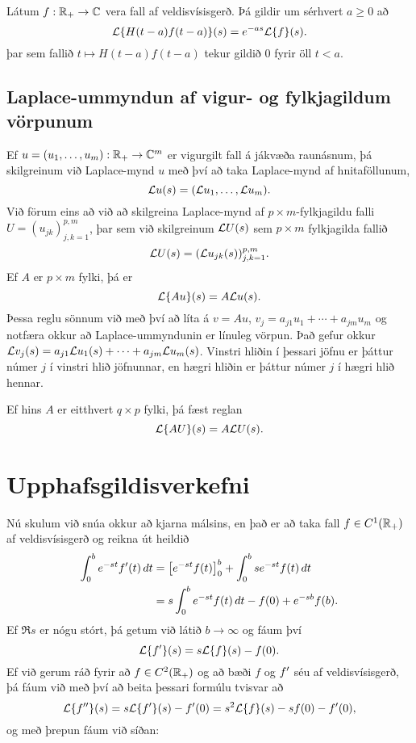 \begin{se}  Látum $f:{\mathbb R}_+\to {\mathbb C}$ vera fall af veldisvísisgerð.  Þá gildir um
sérhvert $a\geq 0$ að
$$
{\cal L}{\{H(t-a)f(t-a)\}}(s) = e^{-as}{\cal L}{\{f\}}(s).
$$
þar sem fallið $t\mapsto H(t-a)f(t-a)$ tekur gildið $0$ fyrir öll
$t<a$. 
\end{se}

\subsection*{Laplace-ummyndun af vigur- og fylkjagildum vörpunum}

Ef $u=(u_1,\dots,u_m): {\mathbb R}_+\to {\mathbb C}^m$ er vigurgilt fall á jákvæða
raunásnum, þá skilgreinum við Laplace-mynd $u$ með því að taka
Laplace-mynd af hnitaföllunum, 
$${\cal L} u(s)=({\cal L} u_1,\dots,{\cal L} u_m).
$$ 
Við
förum eins að við að skilgreina Laplace-mynd af $p\times m$-fylkjagildu
falli $U=(u_{jk})_{j,k=1}^{p,m}$, þar sem við skilgreinum ${\cal L} U(s)$ sem
$p\times m$ fylkjagilda fallið  
$${\cal L} U(s)=({\cal L} u_{jk}(s))_{j,k=1}^{p,m}.
$$
Ef $A$ er $p\times m$ fylki, þá er 
\begin{equation*}
{\cal L}{\{Au\}}(s)=A{\cal L} u(s).
\label{7.1.8}
\end{equation*}
Þessa reglu sönnum við  með því að líta á $v=Au$,
$v_j=a_{j1}u_1+\cdots+a_{jm}u_m$ og notfæra okkur að Laplace-ummyndunin
er línuleg vörpun.  Það gefur okkur ${\cal L} v_j(s)=a_{j1}{\cal L} u_1(s)+\cdots+a_{jm}{\cal L}
u_m(s)$.  Vinstri hliðin í þessari jöfnu er þáttur númer $j$ í vinstri
hlið jöfnunnar, en hægri hliðin er þáttur númer $j$ í hægri hlið hennar.


Ef hins $A$ er eitthvert $q\times p$ fylki, þá fæst reglan
\begin{equation*}
{\cal L}{\{AU\}}(s)=A{\cal L} U(s).
\label{7.1.9}
\end{equation*}



\section{Upphafsgildisverkefni}

\noindent
Nú skulum við snúa okkur að kjarna málsins, en það er að 
taka  fall $f\in C\sp
1({\mathbb R}_+)$ af veldisvísisgerð og reikna út heildið
\begin{align*}
\int_0\sp b e\sp{-st}f{\sp{\prime}}(t)\, dt &=
\left[e\sp{-st}f(t)\right]_0\sp b+
\int_0\sp b se\sp{-st}f(t)\, dt \\
&=
s\int_0\sp b e\sp{-st}f(t)\, dt -f(0)+e\sp{-sb}f(b).
\end{align*}
Ef $\Re s$ er nógu stórt, þá getum við látið $b\to \infty$ og fáum því
 \begin{equation*}{\cal L}{\{f{\sp{\prime}}\}}(s)=s{\cal L}{\{f\}}(s)-f(0).
\label{7.3.1}
 \end{equation*}
Ef við gerum ráð fyrir að $f\in C^2({\mathbb R}_+)$ og að bæði $f$ og $f{\sp{\prime}}$
séu af veldisvísisgerð, þá fáum við með því að
beita þessari formúlu tvisvar  að 
 \begin{equation*}{\cal L}{\{f{\sp{\prime\prime}}\}}(s)=s{\cal L}{\{f{\sp{\prime}}\}}(s)-f{\sp{\prime}}(0)=s\sp 2{\cal L}{\{f\}}(s)
-sf(0)-f{\sp{\prime}}(0),
\label{7.3.2}
 \end{equation*}
og með þrepun fáum við síðan:

